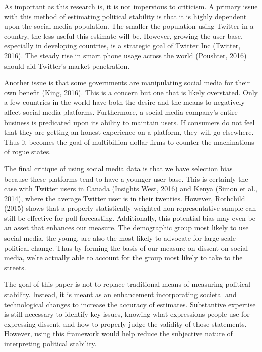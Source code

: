 \documentclass[12pt]{article}
\begin{document}
\begin{spacing}{1.5}
As important as this research is, it is not impervious to criticism. A primary issue with this method of estimating political stability is that it is highly dependent upon the social media population. The smaller the population using Twitter in a country, the less useful this estimate will be. However, growing the user base, especially in developing countries, is a strategic goal of Twitter Inc (Twitter, 2016). The steady rise in smart phone usage across the world (Poushter, 2016) should aid Twitter's market penetration. 

Another issue is that some governments are manipulating social media for their own benefit (King, 2016). This is a concern but one that is likely overstated. Only a few countries in the world have both the desire and the means to negatively affect social media platforms. Furthermore, a social media company's entire business is predicated upon its ability to maintain users. If consumers do not feel that they are getting an honest experience on a platform, they will go elsewhere. Thus it becomes the goal of multibillion dollar firms to counter the machinations of rogue states. 

The final critique of using social media data is that we have selection bias because these platforms tend to have a younger user base. This is certainly the case with Twitter users in Canada (Insights West, 2016) and Kenya (Simon et al., 2014), where the average Twitter user is in their twenties. However, Rothchild (2015) shows that a properly statistically weighted non-representative sample can still be effective for poll forecasting. Additionally, this potential bias may even be an asset that enhances our measure. The demographic group most likely to use social media, the young, are also the most likely to advocate for large scale political change. Thus by forming the basis of our measure on dissent on social media, we're actually able to account for the group most likely to take to the streets.
    
The goal of this paper is not to replace traditional means of measuring political stability. Instead, it is meant as an enhancement incorporating societal and technological changes to increase the accuracy of estimates. Substantive expertise is still necessary to identify key issues, knowing what expressions people use for expressing dissent, and how to properly judge the validity of those statements. However, using this framework would help reduce the subjective nature of interpreting political stability. 


\end{spacing}

\pagebreak




\nocite{*}
\end{document}
